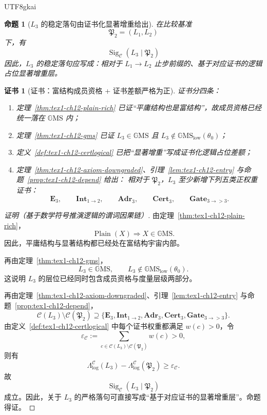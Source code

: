 \documentclass[12pt]{article}
\newtheorem{proposition}{命题}[section]
\newtheorem{Certificate}{证书}[section]
\newcommand{\GMS}{\mathbb{G}\mathrm{MS}}
\begin{document}
\begin{CJK*}{UTF8}{gkai}
\begin{proposition}[\(L_3\) 的稳定落句由证书化显著增重给出]
\label{prop:tex1-ch12-recognize}
在比较基准
\[
  \mathfrak P_2=(L_1,L_2)
\]
下，有
\[
  \boxed{
    \operatorname{Sig}_{\mathcal C}(L_3\mid \mathfrak P_2)
  }
\]
因此，\(L_3\) 的稳定落句应写成：相对于 \(L_1\to L_2\) 止步前缀的、基于对应证书的逻辑占位显著增重层。
\end{proposition}

\begin{Certificate}[证书：富结构成员资格 + 证书差额严格为正]
\label{cert:tex1-ch12-recognize}
证书分四条：
\begin{enumerate}
  \item 定理~\ref{thm:tex1-ch12-plain-rich} 已证“平庸结构也是富结构”，故成员资格已经统一落在 \(\GMS\) 内；
  \item 定理~\ref{thm:tex1-ch12-gms} 已证 \(L_3\in\GMS\) 且 \(L_3\notin \GMS_{\mathrm{low}}(\theta_0)\)；
  \item 定义~\ref{def:tex1-ch12-certlogical} 已把“显著增重”写成证书化逻辑占位差额；
  \item 定理~\ref{thm:tex1-ch12-axiom-downgraded}、引理~\ref{lem:tex1-ch12-entry} 与命题~\ref{prop:tex1-ch12-depend} 给出：
  相对于 \(\mathfrak P_2\)，\(L_3\) 至少新增下列五类正权重证书：
  \[
    \mathbf E_3,\qquad
    \mathbf{Int}_{1\to2},\qquad
    \mathbf{Adr}_3,\qquad
    \mathbf{Cert}_3,\qquad
    \mathbf{Gate}_{3\to >3}.
  \]
\end{enumerate}
\end{Certificate}

\begin{proof}[证明（基于数学符号推演逻辑的谓词因果链）]
由定理~\ref{thm:tex1-ch12-plain-rich}，
\[
  \operatorname{Plain}(X)\Rightarrow X\in \GMS.
\]
因此，平庸结构与显著结构都已经处在富结构宇宙内部。

再由定理~\ref{thm:tex1-ch12-gms}，
\[
  L_3\in \GMS,
  \qquad
  L_3\notin \GMS_{\mathrm{low}}(\theta_0).
\]
这说明 \(L_3\) 的层位已经同时包含成员资格与度量层级两部分。

再由定理~\ref{thm:tex1-ch12-axiom-downgraded}、引理~\ref{lem:tex1-ch12-entry} 与命题~\ref{prop:tex1-ch12-depend}，
\[
  \mathcal C(L_3)\setminus \mathcal C(\mathfrak P_2)
  \supseteq
  \{\mathbf E_3,\mathbf{Int}_{1\to2},\mathbf{Adr}_3,\mathbf{Cert}_3,\mathbf{Gate}_{3\to >3}\}.
\]
由定义~\ref{def:tex1-ch12-certlogical} 中每个证书权重都满足 \(w(c)>0\)，令
\[
  \varepsilon_{\mathcal C}
  :=
  \sum_{c\in \mathcal C(L_3)\setminus \mathcal C(\mathfrak P_2)} w(c)>0,
\]
则有
\[
  \Lambda_{\mathrm{log}}^{\mathcal C}(L_3)-\Lambda_{\mathrm{log}}^{\mathcal C}(\mathfrak P_2)
  \ge
  \varepsilon_{\mathcal C}.
\]
故
\[
  \operatorname{Sig}_{\mathcal C}(L_3\mid \mathfrak P_2)
\]
成立。因此，关于 \(L_3\) 的严格落句可直接写成“基于对应证书的显著增重层”。命题得证。
\end{proof}


\end{CJK*}
\end{document}
